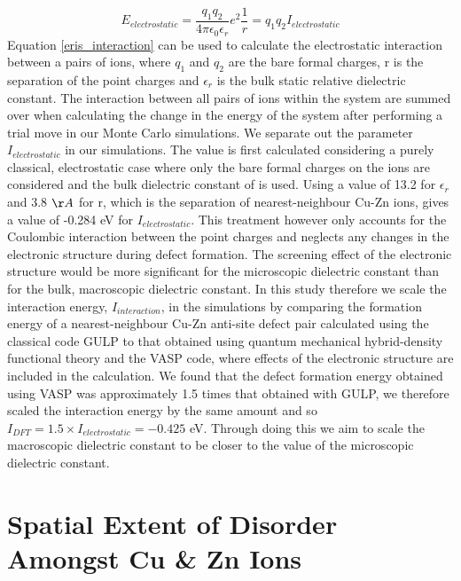 \begin{equation}\label{eris_interaction}
E_{electrostatic} = \frac{q_1q_2}{4\pi\epsilon_0\epsilon_r}e^2\frac{1}{r} = q_1q_2 I_{electrostatic}
\end{equation}
Equation \ref{eris_interaction} can be used to calculate the electrostatic interaction between a pairs of ions, where $q_1$ and $q_2$ are the bare formal charges, r is the separation of the point charges and $\epsilon_r$ is the bulk static relative dielectric constant. The interaction between all pairs of ions within the system are summed over when calculating the change in the energy of the system after performing a trial move in our Monte Carlo simulations.
We separate out the parameter $I_{electrostatic}$ in our simulations. The value is first calculated considering a purely classical, electrostatic case where only the bare formal charges on the ions are considered and the bulk dielectric constant of { \CZTS } is used. Using a value of 13.2 for $\epsilon_r$ and 3.8 $\AA$ for r, which is the separation of nearest-neighbour Cu-Zn ions, gives a value of -0.284 eV for $I_{electrostatic}$.
This treatment however only accounts for the Coulombic interaction between the point charges and neglects any changes in the electronic structure during defect formation. The screening effect of the electronic structure would be more significant for the microscopic dielectric constant than for the bulk, macroscopic dielectric constant.
In this study therefore we scale the interaction energy, $I_{interaction}$, in the simulations by comparing the formation energy of a nearest-neighbour Cu-Zn anti-site defect pair calculated using the classical code GULP to that obtained using quantum mechanical hybrid-density functional theory and the VASP code, where effects of the electronic structure are included in the calculation. We found that the defect formation energy obtained using VASP was approximately 1.5 times that obtained with GULP, we therefore scaled the interaction energy by the same amount and so $I_{DFT} = 1.5 \times I_{electrostatic} = - 0.425$ eV. Through doing this we aim to scale the macroscopic dielectric constant to be closer to the value of the microscopic dielectric constant.

\section{Spatial Extent of Disorder Amongst Cu \& Zn Ions}


